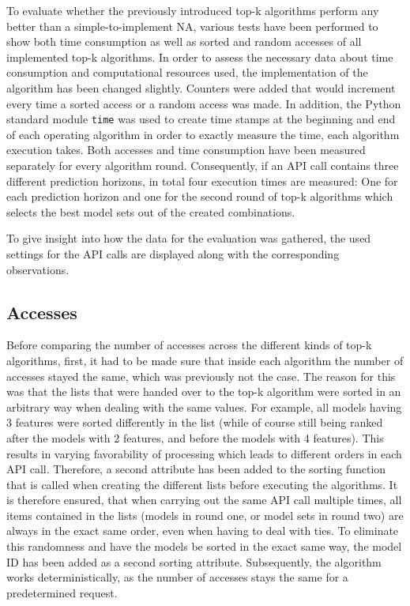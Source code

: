 To evaluate whether the previously introduced top-k algorithms perform any better than a simple-to-implement NA, various tests have been performed to show both time consumption as well as sorted and random accesses of all implemented top-k algorithms. In order to assess the necessary data about time consumption and computational resources used, the implementation of the algorithm has been changed slightly. Counters were added that would increment every time a sorted access or a random access was made. In addition, the Python standard module \texttt{time} was used to create time stamps at the beginning and end of each operating algorithm in order to exactly measure the time, each algorithm execution takes. Both accesses and time consumption have been measured separately for every algorithm round. Consequently, if an API call contains three different prediction horizons, in total four execution times are measured: One for each prediction horizon and one for the second round of top-k algorithms which selects the best model sets out of the created combinations. 

To give insight into how the data for the evaluation was gathered, the used settings for the API calls are displayed along with the corresponding observations. 



\subsection{Accesses}

Before comparing the number of accesses across the different kinds of top-k algorithms, first, it had to be made sure that inside each algorithm the number of accesses stayed the same, which was previously not the case. The reason for this was that the lists that were handed over to the top-k algorithm were sorted in an arbitrary way when dealing with the same values. For example, all models having 3 features were sorted differently in the list (while of course still being ranked after the models with 2 features, and before the models with 4 features). This results in varying favorability of processing which leads to different orders in each API call. Therefore, a second attribute has been added to the sorting function that is called when creating the different lists before executing the algorithms. It is therefore ensured, that when carrying out the same API call multiple times, all items contained in the lists (models in round one, or model sets in round two) are always in the exact same order, even when having to deal with ties. To eliminate this randomness and have the models be sorted in the exact same way, the model ID has been added as a second sorting attribute. Subsequently, the algorithm works deterministically, as the number of accesses stays the same for a predetermined request. 


